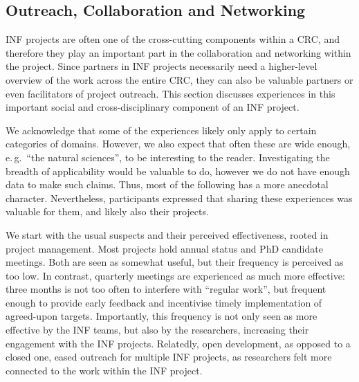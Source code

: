 \documentclass{eceasst}
\newcommand{\eg}{e.\,g.}
\begin{document}
\subsection{Outreach, Collaboration and Networking}
INF projects are often one of the cross-cutting components within a CRC,
and therefore they play an important part in the collaboration and networking within the project.
Since partners in INF projects necessarily need a higher-level overview of the work across the entire CRC, 
they can also be valuable partners or even facilitators of project outreach. 
This section discusses experiences in this important social and cross-disciplinary component of an INF project.

We acknowledge that some of the experiences likely only apply to certain categories of domains.
However, we also expect that often these are wide enough, \eg~“the natural sciences”, to be interesting to the reader.
Investigating the breadth of applicability would be valuable to do, however we do not have enough data to make such claims. 
Thus, most of the following has a more anecdotal character. Nevertheless, participants expressed that sharing these experiences 
was valuable for them, and likely also their projects. 

We start with the usual suspects and their perceived effectiveness, rooted in project management.
Most projects hold annual status and PhD candidate meetings.
Both are seen as somewhat useful, but their frequency is perceived as too low.
In contrast, quarterly meetings are experienced as much more effective: 
three months is not too often to interfere with “regular work”, 
but frequent enough to provide early feedback and incentivise timely implementation of agreed-upon targets.
Importantly, this frequency is not only seen as more effective by the INF teams,
but also by the researchers, increasing their engagement with the INF projects.
Relatedly, open development, as opposed to a closed one, eased outreach for multiple INF projects,
as researchers felt more connected to the work within the INF project. 
\end{document}
